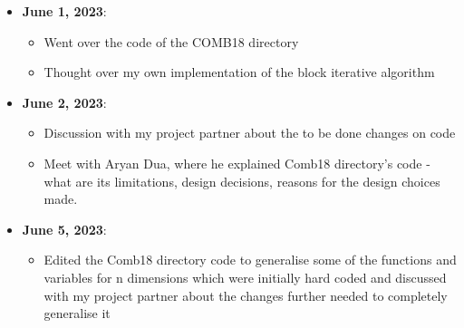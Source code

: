 \documentclass[a4paper,11pt,fleqn]{article}
\theoremstyle{plain}{\theorembodyfont{\rmfamily}%
\newtheorem{conjecture}[theorem]{Conjecture}}
\theoremstyle{plain}{\theorembodyfont{\rmfamily}%
\newtheorem{example}[theorem]{Example}}
\theoremstyle{plain}{\theorembodyfont{\rmfamily}%
\newtheorem{remark}[theorem]{Remark}}
\theoremstyle{plain}{\theorembodyfont{\rmfamily}%
\newtheorem{algorithm}[theorem]{Algorithm}}
\theoremstyle{plain}{\theorembodyfont{\rmfamily}%
\newtheorem{condition}[theorem]{Condition}}
\theoremstyle{plain}{\theorembodyfont{\rmfamily}%
\newtheorem{definition}[theorem]{Definition}}
\theoremstyle{plain}{\theorembodyfont{\rmfamily}
\newtheorem{fact}[theorem]{Fact}}
\theoremstyle{plain}{\theorembodyfont{\rmfamily}
\newtheorem{problem}[theorem]{Problem}}
\theoremstyle{plain}{\theorembodyfont{\rmfamily}
\newtheorem{notation}[theorem]{Notation}}
\theoremstyle{plain}{\theorembodyfont{\rmfamily}
\newtheorem{project}[theorem]{Project}}
\begin{document}
\begin{itemize}
\item 
{\bf June 1, 2023}:
\begin{itemize} 
    \item Went over the code of the COMB18 directory
    \item Thought over my own implementation of the block iterative algorithm
\end{itemize}

\item {\bf June 2, 2023}:
\begin{itemize} 
\item Discussion with my project partner about the to be done changes on code
\item Meet with Aryan Dua, where he explained Comb18 directory's code - what are its limitations, design decisions, reasons for the design choices made.
\end{itemize}

\item {\bf June 5, 2023}:
\begin{itemize} 
\item Edited the Comb18 directory code to generalise some of the functions and variables for n dimensions which were initially hard coded and discussed with my project partner about the changes further needed to completely generalise it
\end{itemize}

\end{itemize}



\end{document}
